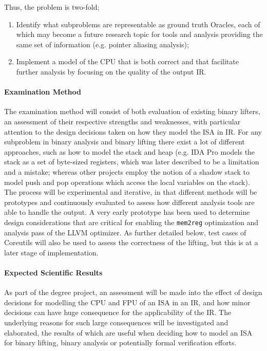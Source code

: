 \documentclass[12pt, a4paper]{article}
\begin{document}
Thus, the problem is two-fold;
\begin{enumerate}
	\item Identify what subproblems are representable as ground truth Oracles, each of which may become a future research topic for tools and analysis providing the same set of information (e.g. pointer aliasing analysis);
	\item Implement a model of the CPU that is both correct and that facilitate further analysis by focusing on the quality of the output IR.
\end{enumerate}


\paragraph{Examination Method}

The examination method will consist of both evaluation of existing binary lifters, an assessment of their respective strengths and weaknesses, with particular attention to the design decisions taken on how they model the ISA in IR. For any subproblem in binary analysis and binary lifting there exist a lot of different approaches, such as how to model the stack and heap (e.g. IDA Pro models the stack as a set of byte-sized registers, which was later described to be a limitation and a mistake; whereas other projects employ the notion of a shadow stack to model push and pop operations which access the local variables on the stack). The process will be experimental and iterative, in that different methods will be prototypes and continuously evaluated to assess how different analysis tools are able to handle the output. A very early prototype has been used to determine design considerations that are critical for enabling the \texttt{mem2reg} optimization and analysis pass of the LLVM optimizer. As further detailed below, test cases of Coreutils will also be used to assess the correctness of the lifting, but this is at a later stage of implementation.


\paragraph{Expected Scientific Results}

As part of the degree project, an assessment will be made into the effect of design decisions for modelling the CPU and FPU of an ISA in an IR, and how minor decisions can have huge consequence for the applicability of the IR. The underlying reasons for such large consequences will be investigated and elaborated, the results of which are useful when deciding how to model an ISA for binary lifting, binary analysis or potentially formal verification efforts.
\end{document}
